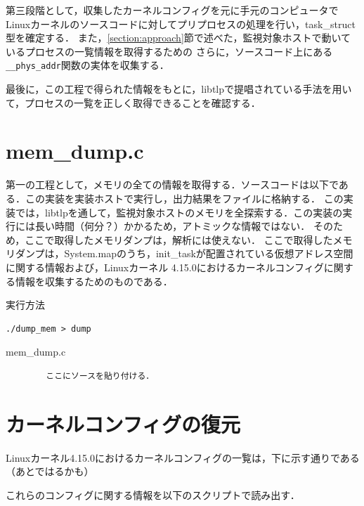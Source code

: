 第三段階として，収集したカーネルコンフィグを元に手元のコンピュータでLinuxカーネルのソースコードに対してプリプロセスの処理を行い，task\_struct型を確定する．
また，\ref{section:approach}節で述べた，監視対象ホストで動いているプロセスの一覧情報を取得するための
さらに，ソースコード上にある\verb|__phys_addr|関数の実体を収集する．

最後に，この工程で得られた情報をもとに，libtlpで提唱されている手法を用いて，プロセスの一覧を正しく取得できることを確認する．

\section{mem\_dump.c}
\label{section:mem_dump}

第一の工程として，メモリの全ての情報を取得する．ソースコードは以下である．この実装を実装ホストで実行し，出力結果をファイルに格納する．
この実装では，libtlpを通して，監視対象ホストのメモリを全探索する．この実装の実行には長い時間（何分？）かかるため，アトミックな情報ではない．
そのため，ここで取得したメモリダンプは，解析には使えない．
ここで取得したメモリダンプは，System.mapのうち，init\_taskが配置されている仮想アドレス空間に関する情報および，Linuxカーネル 4.15.0におけるカーネルコンフィグに関する情報を収集するためのものである．


\begin{itembox}[l]{実行方法}
    \begin{verbatim}
./dump_mem > dump
    \end{verbatim}
\end{itembox}

\begin{itembox}[l]{mem_dump.c}
    \begin{verbatim}
        ここにソースを貼り付ける．
    \end{verbatim}
\end{itembox}

\section{カーネルコンフィグの復元}
\label{section:restore_kconfig}

Linuxカーネル4.15.0におけるカーネルコンフィグの一覧は，下に示す通りである（あとではるかも）

これらのコンフィグに関する情報を以下のスクリプトで読み出す．

